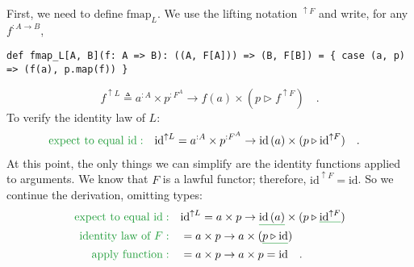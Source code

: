 First, we need to define $\text{fmap}_{L}$. We use the lifting notation
$^{\uparrow F}$ and write, for any $f^{:A\rightarrow B}$,
\begin{lstlisting}
def fmap_L[A, B](f: A => B): ((A, F[A])) => (B, F[B]) = { case (a, p) => (f(a), p.map(f)) }
\end{lstlisting}
\[
f^{\uparrow L}\triangleq a^{:A}\times p^{:F^{A}}\rightarrow f(a)\times(p\triangleright f^{\uparrow F})\quad.
\]
To verify the identity law of $L$:
\begin{align*}
{\color{greenunder}\text{expect to equal }\text{id}:}\quad & \text{id}^{\uparrow L}=a^{:A}\times p^{:F^{A}}\rightarrow\text{id}\,(a)\times(p\triangleright\text{id}^{\uparrow F})\quad.
\end{align*}
At this point, the only things we can simplify are the identity functions
applied to arguments. We know that $F$ is a lawful functor; therefore,
$\text{id}^{\uparrow F}=\text{id}$. So we continue the derivation,
omitting types:
\begin{align*}
{\color{greenunder}\text{expect to equal }\text{id}:}\quad & \text{id}^{\uparrow L}=a\times p\rightarrow\gunderline{\text{id}\,(a)}\times(p\triangleright\gunderline{\text{id}^{\uparrow F}})\\
{\color{greenunder}\text{identity law of }F:}\quad & =a\times p\rightarrow a\times(\gunderline{p\triangleright\text{id}})\\
{\color{greenunder}\text{apply function}:}\quad & =a\times p\rightarrow a\times p=\text{id}\quad.
\end{align*}

